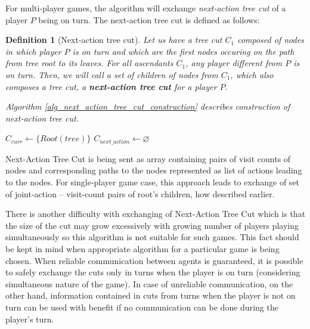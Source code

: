 For multi-player games, the algorithm will exchange \emph{next-action tree cut} of a player $P$
being on turn. The next-action tree cut is defined as follows:

\newtheorem*{defnextactiontreecut}{Definition}
\begin{defnextactiontreecut}[Next-action tree cut]
Let us have a tree cut $C_1$ composed of nodes in which player $P$ is on turn and which are the first
nodes occuring on the path from tree root to its leaves. For all ascendants $C_1$, any player
different from $P$ is on turn. Then, we will call a set of children of nodes from $C_1$, which
also composes a tree cut, a \textbf{next-action tree cut} for a player $P$.

Algorithm \ref{alg_next_action_tree_cut_construction} describes construction of next-action
tree cut. 

\end{defnextactiontreecut}

\begin{algorithm}
\DontPrintSemicolon
\caption{$BuildNextActionTreeCut(tree, player)$\label{alg_next_action_tree_cut_construction}}
$C_{curr} \leftarrow \{Root(tree)\}$ \;
$C_{next\_action} \leftarrow \varnothing$ \;
\end{algorithm}

Next-Action Tree Cut is being sent as array containing pairs of visit counts of nodes and
corresponding paths to the nodes represented as list of actions leading to the nodes. For
single-player game case, this approach leads to exchange of set of joint-action -- visit-count
pairs of root's children, how described earlier.

There is another difficulty with exchanging of Next-Action Tree Cut which is that the size of
the cut may grow excessively with growing number of players playing simultaneously so this 
algorithm is not suitable for such games. This fact should be kept in mind
when appropriate algorithm for a particular game is being chosen. When reliable communication
between agents is guaranteed, it is possible to safely exchange the cuts only in turns when the
player is on turn (considering simultaneous nature of the game). In case of unreliable
communication, on the other hand, information contained in cuts from turns when the player is
not on turn can be used with benefit if no communication can be done during the player's turn.


